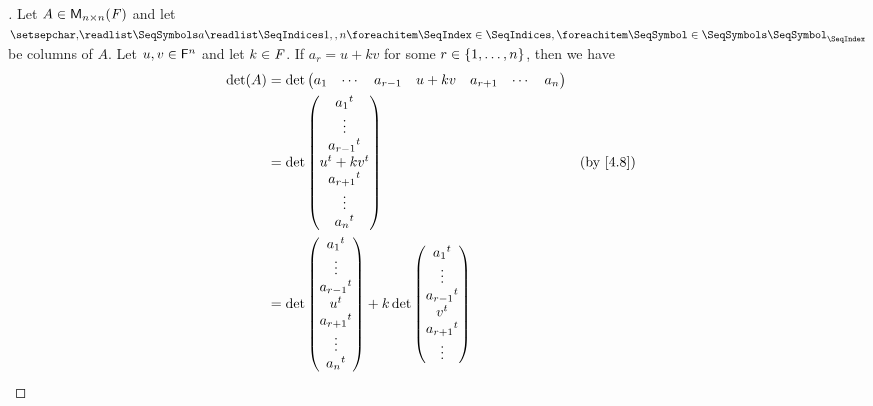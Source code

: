 \begin{proof}[]
	Let \(A \in \mathsf{M}_{{n} \times n}({\mathit{F}})\) and let \(\seq{a}{1,,n}\) be columns of \(A\).
	Let \(u, v \in \mathsf{F}^n\) and let \(k \in \mathit{F}\).
	If \(a_r = u + kv\) for some \(r \in \left\lbrace1, \dots, n\right\rbrace\), then we have
	\begin{align*}
		\det(A) & = \det\begin{pmatrix}
			                a_1 & \cdots & a_{r - 1} & u + kv & a_{r + 1} & \cdots & a_n
		                \end{pmatrix}              \\
		        & = \det\begin{pmatrix}
			                \tp{a_1}          \\
			                \vdots            \\
			                \tp{a_{r - 1}}    \\
			                \tp{u} + k \tp{v} \\
			                \tp{a_{r + 1}}    \\
			                \vdots            \\
			                \tp{a_n}
		                \end{pmatrix}                      &  & \by{4.8}                          \\
		        & = \det\begin{pmatrix}
			                \tp{a_1}       \\
			                \vdots         \\
			                \tp{a_{r - 1}} \\
			                \tp{u}         \\
			                \tp{a_{r + 1}} \\
			                \vdots         \\
			                \tp{a_n}
		                \end{pmatrix} + k \det\begin{pmatrix}
			                                      \tp{a_1}       \\
			                                      \vdots         \\
			                                      \tp{a_{r - 1}} \\
			                                      \tp{v}         \\
			                                      \tp{a_{r + 1}} \\
			                                      \vdots         \\

\end{pmatrix}
\end{align*}
\end{proof}
